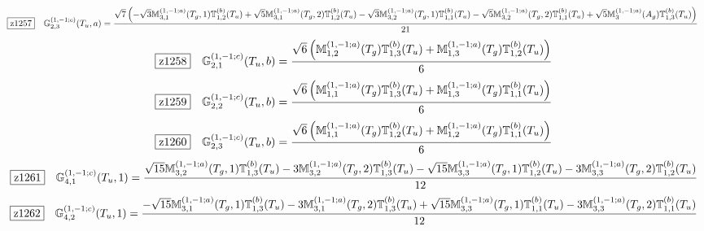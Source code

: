\documentclass[fleqn,10pt,landscape]{jsarticle}
\begin{document}
\begin{dmath*}
\hspace*{3mm}\fbox{z1257}\quad \mathbb{G}_{2,3}^{(1,-1;c)}(T_{u},a)=\frac{\sqrt{7} \left(- \sqrt{3} \mathbb{M}_{3,1}^{(1,-1;a)}(T_{g},1) \mathbb{T}_{1,2}^{(b)}(T_{u}) + \sqrt{5} \mathbb{M}_{3,1}^{(1,-1;a)}(T_{g},2) \mathbb{T}_{1,2}^{(b)}(T_{u}) - \sqrt{3} \mathbb{M}_{3,2}^{(1,-1;a)}(T_{g},1) \mathbb{T}_{1,1}^{(b)}(T_{u}) - \sqrt{5} \mathbb{M}_{3,2}^{(1,-1;a)}(T_{g},2) \mathbb{T}_{1,1}^{(b)}(T_{u}) + \sqrt{5} \mathbb{M}_{3}^{(1,-1;a)}(A_{g}) \mathbb{T}_{1,3}^{(b)}(T_{u})\right)}{21}
\end{dmath*}
\begin{dmath*}
\hspace*{3mm}\fbox{z1258}\quad \mathbb{G}_{2,1}^{(1,-1;c)}(T_{u},b)=\frac{\sqrt{6} \left(\mathbb{M}_{1,2}^{(1,-1;a)}(T_{g}) \mathbb{T}_{1,3}^{(b)}(T_{u}) + \mathbb{M}_{1,3}^{(1,-1;a)}(T_{g}) \mathbb{T}_{1,2}^{(b)}(T_{u})\right)}{6}
\end{dmath*}
\begin{dmath*}
\hspace*{3mm}\fbox{z1259}\quad \mathbb{G}_{2,2}^{(1,-1;c)}(T_{u},b)=\frac{\sqrt{6} \left(\mathbb{M}_{1,1}^{(1,-1;a)}(T_{g}) \mathbb{T}_{1,3}^{(b)}(T_{u}) + \mathbb{M}_{1,3}^{(1,-1;a)}(T_{g}) \mathbb{T}_{1,1}^{(b)}(T_{u})\right)}{6}
\end{dmath*}
\begin{dmath*}
\hspace*{3mm}\fbox{z1260}\quad \mathbb{G}_{2,3}^{(1,-1;c)}(T_{u},b)=\frac{\sqrt{6} \left(\mathbb{M}_{1,1}^{(1,-1;a)}(T_{g}) \mathbb{T}_{1,2}^{(b)}(T_{u}) + \mathbb{M}_{1,2}^{(1,-1;a)}(T_{g}) \mathbb{T}_{1,1}^{(b)}(T_{u})\right)}{6}
\end{dmath*}
\begin{dmath*}
\hspace*{3mm}\fbox{z1261}\quad \mathbb{G}_{4,1}^{(1,-1;c)}(T_{u},1)=\frac{\sqrt{15} \mathbb{M}_{3,2}^{(1,-1;a)}(T_{g},1) \mathbb{T}_{1,3}^{(b)}(T_{u}) - 3 \mathbb{M}_{3,2}^{(1,-1;a)}(T_{g},2) \mathbb{T}_{1,3}^{(b)}(T_{u}) - \sqrt{15} \mathbb{M}_{3,3}^{(1,-1;a)}(T_{g},1) \mathbb{T}_{1,2}^{(b)}(T_{u}) - 3 \mathbb{M}_{3,3}^{(1,-1;a)}(T_{g},2) \mathbb{T}_{1,2}^{(b)}(T_{u})}{12}
\end{dmath*}
\begin{dmath*}
\hspace*{3mm}\fbox{z1262}\quad \mathbb{G}_{4,2}^{(1,-1;c)}(T_{u},1)=\frac{- \sqrt{15} \mathbb{M}_{3,1}^{(1,-1;a)}(T_{g},1) \mathbb{T}_{1,3}^{(b)}(T_{u}) - 3 \mathbb{M}_{3,1}^{(1,-1;a)}(T_{g},2) \mathbb{T}_{1,3}^{(b)}(T_{u}) + \sqrt{15} \mathbb{M}_{3,3}^{(1,-1;a)}(T_{g},1) \mathbb{T}_{1,1}^{(b)}(T_{u}) - 3 \mathbb{M}_{3,3}^{(1,-1;a)}(T_{g},2) \mathbb{T}_{1,1}^{(b)}(T_{u})}{12}
\end{dmath*}
\end{document}
